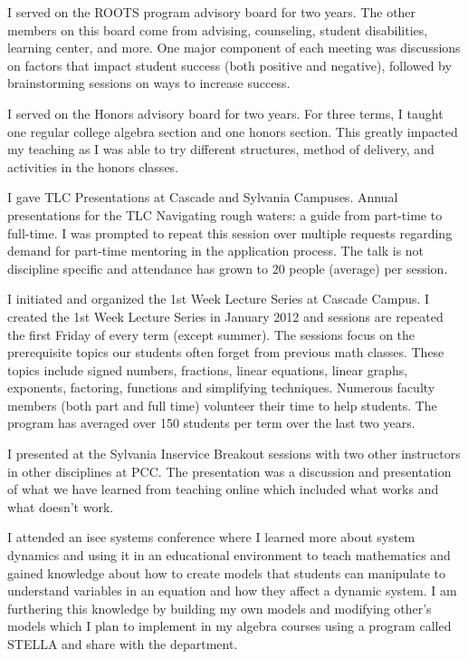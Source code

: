 \begin{description}[style=nextline]
	\item[Ronda Lively (Faculty Chair, Sylvania Campus)]
	I served on the ROOTS program advisory board for two years.  The other members
	on this board come from advising, counseling, student disabilities, learning
	center, and more. One major component of each meeting was discussions on
	factors that impact student success (both positive and negative), followed by
	brainstorming sessions on ways to increase success.

	I served on the Honors advisory board for two years.  For three terms, I taught
	one regular college algebra section and one honors section. This greatly
	impacted my teaching as I was able to try different structures, method of
	delivery, and activities in the honors classes.

	\item[Tammy Louie (Full-time Instructor, Cascade Campus)]
	I gave TLC Presentations at Cascade and Sylvania Campuses.  Annual
	presentations for the TLC Navigating rough waters: a guide from part-time
	to full-time. I was prompted to repeat this session over multiple requests
	regarding demand for part-time mentoring in the application process. The talk
	is not discipline specific and attendance has grown to 20 people (average) per
	session.

	I initiated and organized the 1st Week Lecture Series at Cascade
	Campus.  I created the 1st Week Lecture Series in January 2012 and sessions are
	repeated the first Friday of every term (except summer). The sessions focus on
	the prerequisite topics our students often forget from previous math classes.
	These topics include signed numbers, fractions, linear equations, linear
	graphs, exponents, factoring, functions and simplifying techniques. Numerous
	faculty members (both part and full time) volunteer their time to help
	students. The program has averaged over 150 students per term over the last two
	years.

\item[Rita Luetkenhaus (Temporary Job-share Instructor, Sylvania Campus)]
	I presented at the Sylvania Inservice Breakout sessions with two other
	instructors in other disciplines at PCC.  The presentation was a discussion and
	presentation of what we have learned from teaching online which included what
	works and what doesn't work.

	I attended an isee systems conference where I learned more about system
	dynamics and using it in an educational environment to teach mathematics and
	gained knowledge about how to create models that students can manipulate to
	understand variables in an equation and how they affect a dynamic system.  I am
	furthering this knowledge by building my own models and modifying other's
	models which I plan to implement in my algebra courses using a program called
	STELLA and share with the department.


\end{description}
